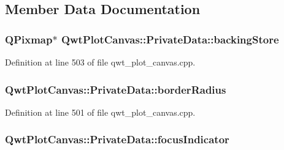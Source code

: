 \subsection{Member Data Documentation}
\hypertarget{class_qwt_plot_canvas_1_1_private_data_a8ecdec2b2e54e97186757722f28e5169}{
\subsubsection[{backing\-Store}]{\setlength{\rightskip}{0pt plus 5cm}Q\-Pixmap$\ast$ Qwt\-Plot\-Canvas\-::\-Private\-Data\-::backing\-Store}}\label{class_qwt_plot_canvas_1_1_private_data_a8ecdec2b2e54e97186757722f28e5169}


Definition at line 503 of file qwt\-\_\-plot\-\_\-canvas.\-cpp.

\hypertarget{class_qwt_plot_canvas_1_1_private_data_a2cb52e9259169c165196465044e1c09a}{
\subsubsection[{border\-Radius}]{ Qwt\-Plot\-Canvas\-::\-Private\-Data\-::border\-Radius}}\label{class_qwt_plot_canvas_1_1_private_data_a2cb52e9259169c165196465044e1c09a}


Definition at line 501 of file qwt\-\_\-plot\-\_\-canvas.\-cpp.

\hypertarget{class_qwt_plot_canvas_1_1_private_data_a4d62d449443eb4da9141e25d2b4755a9}{
\subsubsection[{focus\-Indicator}]{ Qwt\-Plot\-Canvas\-::\-Private\-Data\-::focus\-Indicator}}\label{class_qwt_plot_canvas_1_1_private_data_a4d62d449443eb4da9141e25d2b4755a9}



